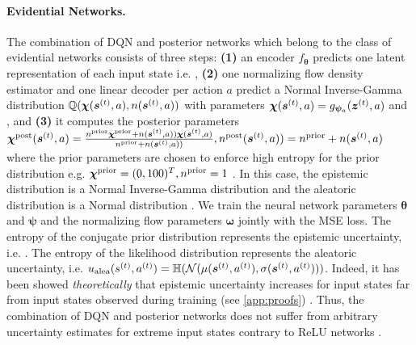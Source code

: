 \paragraph{Evidential Networks.} The combination of DQN and posterior networks \citep{natpn, charpentier2020}  which belong to the class of evidential networks consists of three steps: \textbf{(1)} an encoder $ f_{\bm{\theta}}$ predicts one latent representation of each input state i.e. , \textbf{(2)} one normalizing flow density estimator  and one linear decoder  per action $a$ predict a Normal Inverse-Gamma distribution $\operatorname{\mathbb{Q}}(\bm{\chi}(\bm{s}^{(t)}, a), n(\bm{s}^{(t)}, a))$ with parameters $\bm{\chi}(\bm{s}^{(t)}, a) = g_{\bm{\psi}_{a}}(\bm{z}^{(t)}, a)$ and , and \textbf{(3)} it computes the posterior parameters $\bm{\chi}^\text{post}(\bm{s}^{(t)}, a) = \frac{n^\text{prior}\bm{\chi}^\text{prior} + n(\bm{s}^{(t)}, a)) \bm{\chi}(\bm{s}^{(t)}, a)}{n^\text{prior} + n(\bm{s}^{(t)}, a))}, n^\text{post}(\bm{s}^{(t)}, a)) = n^\text{prior} + n(\bm{s}^{(t)}, a)$ where the prior parameters are chosen to enforce high entropy for the prior distribution e.g. ${\bm{\chi}^\text{prior}=(0, 100)^T}, n^\text{prior}=1$ \citep{natpn}. In this case, the epistemic distribution is a Normal Inverse-Gamma distribution and the aleatoric distribution is a Normal distribution \citep{natpn}. We train the neural network parameters $\bm{\theta}$ and $\bm{\psi}$ and the normalizing flow parameters $\bm{\omega}$ jointly with the MSE loss. The entropy of the conjugate prior distribution represents the epistemic uncertainty, i.e. . The entropy of the likelihood distribution represents the aleatoric uncertainty, i.e. $u_\text{alea}(s^{(t)}, a^{(t)}) = \operatorname{\mathbb{H}}(\operatorname{\mathcal{N}}(\mu(\bm{s}^{(t)}, a^{(t)}), \sigma(\bm{s}^{(t)}, a^{(t)})))$. Indeed, it has been showed \emph{theoretically} that epistemic uncertainty increases for input states far from input states observed during training (see \cref{app:proofs}) \citep{natpn}. Thus, the combination of DQN and posterior networks does not suffer from arbitrary uncertainty estimates for extreme input states contrary to ReLU networks \citep{overconfident-relu}.
